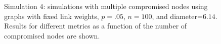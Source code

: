 \begin{figure}
\centering
{}
\caption{Simulation 4: simulations with multiple compromised nodes using \er graphs with fixed link weights, $p=.05$, $n=100$, and diameter=$6.14$.  
Results for different metrics as a function of the number of compromised nodes are shown.}
\label{fig:many-fixed}
\end{figure}



